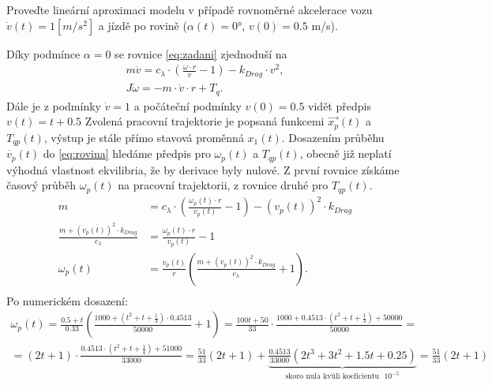 \documentclass[twoside]{article}
\begin{document}
\section{}
\label{sec:ukol3}
Proveďte lineární aproximaci modelu v případě rovnoměrné akcelerace vozu $\dot{v}(t) = 1 [ m/s^2]$ a jízdě
po rovině ($\alpha(t) = 0$°, $v(0) = 0.5$ m/s).

Díky podmínce $\alpha = 0$ se rovnice \eqref{eq:zadani} zjednoduší na
\begin{equation}
	\begin{split}
		m\dot{v} = c_\lambda \cdot \left(\frac{\omega \cdot r}{v} - 1 \right) - k_{Drag} \cdot v^2, \\
		J \dot{\omega} = -m \cdot \dot{v} \cdot r + T_q.
	\end{split}
	\label{eq:rovina}
\end{equation}
Dále je z podmínky $\dot{v} = 1$ a počáteční podmínky $v(0) = 0.5$ vidět předpis $v(t) = t + 0.5$
Zvolená pracovní trajektorie je popsaná funkcemi $\vec{x_p}(t)$ a $T_{qp}(t)$, výstup je stále přímo stavová proměnná $x_1(t)$.
Dosazením průběhu $\dot{v_p}(t)$ do \eqref{eq:rovina} hledáme předpis pro $\omega_p(t)$ a $T_{qp}(t)$, obecně již neplatí výhodná vlastnost ekvilibria, že by derivace byly nulové.
Z první rovnice získáme časový průběh $\omega_p(t)$ na pracovní trajektorii, z rovnice druhé pro $T_{qp}(t)$.
\begin{equation}
	\begin{split}
		m &= c_\lambda \cdot \left(\frac{\omega_p(t) \cdot r}{v_p(t)} - 1 \right) - (v_p(t))^2 \cdot k_{Drag} \\
		\frac{m + (v_p(t))^2 \cdot k_{Drag}}{c_\lambda} &= \frac{\omega_p(t) \cdot r}{v_p(t)} - 1 \\
		\omega_p(t) &= \frac{v_p(t)}{r} \left(\frac{m + (v_p(t))^2 \cdot k_{Drag}}{c_\lambda} + 1\right). \\
	\end{split}
	\label{eq:omegap}
	\end{equation}
Po numerickém dosazení:
\begin{equation}
	\begin{split}
	\omega_p(t) = \frac{0.5 + t}{0.33} (\frac{1000 + (t^2 + t + \frac{1}{4}) \cdot 0.4513}{50000} + 1)
	= \frac{100t + 50}{33} \cdot \frac{1000 + 0.4513 \cdot (t^2 + t + \frac{1}{4}) + 50000}{50000} = \\
	= (2t + 1) \cdot \frac{0.4513 \cdot (t^2 + t + \frac{1}{4}) + 51000}{33000} = \frac{51}{33} (2t+1) + \underbrace{\frac{0.4513}{33000} (2t^3 + 3t^2 + 1.5t + 0.25)}_{\text{skoro nula kvůli koeficientu ~} 10^{-5} } = \frac{51}{33}(2t+1)
	\end{split}
\end{equation}
\end{document}
